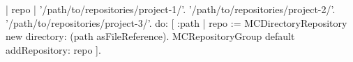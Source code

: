 \documentclass[a4paper,10pt,twoside]{book}
\begin{document}
\begin{code}
| repo |
{'/path/to/repositories/project-1/'. 
'/path/to/repositories/project-2/'. 
'/path/to/repositories/project-3/'. } do: 
[ :path |
	repo := MCDirectoryRepository new directory: 
		(path asFileReference).
	MCRepositoryGroup default addRepository: repo ].
\end{code}







\end{document}
